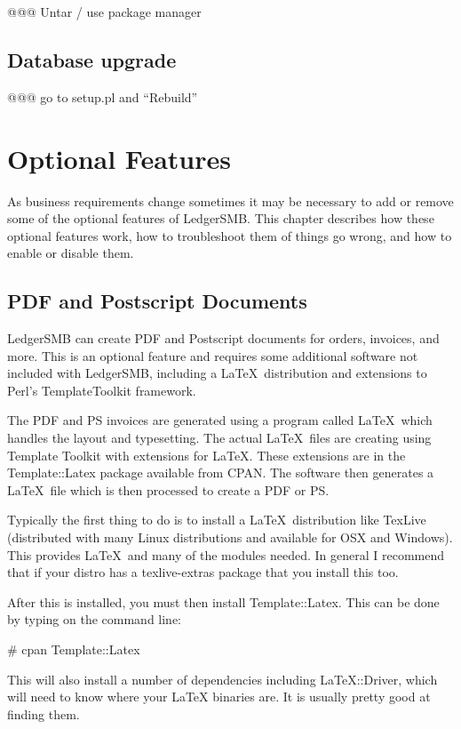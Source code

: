 @@@ Untar / use package manager

\section{Database upgrade}
\label{sec-updates-database-upgrades}

@@@ go to setup.pl and ``Rebuild''

\chapter{Optional Features}
\label{cha-options}

As business requirements change sometimes it may be necessary to add or remove
some of the optional features of LedgerSMB.  This chapter describes how these
optional features work, how to troubleshoot them of things go wrong, and how to
enable or disable them.

\section{PDF and Postscript Documents}
\label{sec-options-pdf}

LedgerSMB can create PDF and Postscript documents for orders, invoices, and
more.  This is an optional feature and requires some additional software not
included with LedgerSMB, including a \LaTeX\ distribution and extensions to 
Perl's TemplateToolkit framework.

The PDF and PS invoices are generated using a program called \LaTeX\
which handles the layout and typesetting.  The actual \LaTeX\ files are
creating using Template Toolkit with extensions for \LaTeX.  These
extensions are in the Template::Latex package available from CPAN.
The software then generates a \LaTeX\ file which is then processed to
create a PDF or PS.

Typically the first thing to do is to install a \LaTeX\ distribution
like TexLive (distributed with many Linux distributions and available
for OSX and Windows).  This provides \LaTeX\ and many of the modules
needed.   In general I recommend that if your distro has a
texlive-extras package that you install this too.

After this is installed, you must then install Template::Latex.  This
can be done by typing on the command line:

\# cpan Template::Latex

This will also install a number of dependencies including
LaTeX::Driver, which will need to know where your LaTeX binaries are.
It is usually pretty good at finding them.

